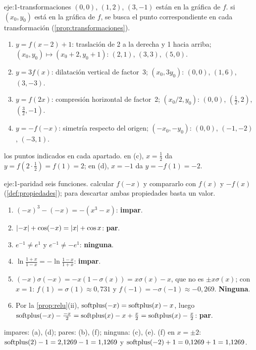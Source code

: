 \begin{solucion}{eje:1-transformaciones}
\datos $(0,0)$, $(1,2)$, $(3,-1)$ están en la gráfica de $f$.
\planteamiento si $(x_0,y_0)$ está en la gráfica de $f$, se busca el punto correspondiente en cada transformación (\cref{prop:transformaciones}).
\pasos
\begin{enumerate}[label=(\alph*)]
  \item $y=f(x-2)+1$: traslación de 2 a la derecha y 1 hacia arriba; $(x_0,y_0)\mapsto(x_0+2,y_0+1)$: $(2,1)$, $(3,3)$, $(5,0)$.
  \item $y=3f(x)$: dilatación vertical de factor~3; $(x_0,3y_0)$: $(0,0)$, $(1,6)$, $(3,-3)$.
  \item $y=f(2x)$: compresión horizontal de factor~2; $(x_0/2,y_0)$: $(0,0)$, $(\tfrac12,2)$, $(\tfrac32,-1)$.
  \item $y=-f(-x)$: simetría respecto del origen; $(-x_0,-y_0)$: $(0,0)$, $(-1,-2)$, $(-3,1)$.
\end{enumerate}
\resultado los puntos indicados en cada apartado.
\comprobacion en (c), $x=\tfrac12$ da $y=f(2\cdot\tfrac12)=f(1)=2$; en (d), $x=-1$ da $y=-f(1)=-2$.
\end{solucion}

\begin{solucion}{eje:1-paridad}
\datos seis funciones.
\planteamiento calcular $f(-x)$ y compararlo con $f(x)$ y $-f(x)$ (\cref{def:propiedades}); para descartar ambas propiedades basta un valor.
\pasos
\begin{enumerate}[label=(\alph*)]
  \item $(-x)^{3}-(-x)=-(x^{3}-x)$: \textbf{impar}.
  \item $\lvert-x\rvert+\cos(-x)=\lvert x\rvert+\cos x$: \textbf{par}.
  \item $e^{-1}\ne e^{1}$ y $e^{-1}\ne-e^{1}$: \textbf{ninguna}.
  \item $\ln\frac{1+x}{1-x}=-\ln\frac{1-x}{1+x}$: \textbf{impar}.
  \item $(-x)\sigma(-x)=-x(1-\sigma(x))=x\sigma(x)-x$, que no es $\pm x\sigma(x)$; con $x=1$: $f(1)=\sigma(1)\approx0{,}731$ y $f(-1)=-\sigma(-1)\approx-0{,}269$. \textbf{Ninguna}.
  \item Por la \cref{prop:relu}(ii), $\operatorname{softplus}(-x)=\operatorname{softplus}(x)-x$, luego $\operatorname{softplus}(-x)-\frac{-x}{2}=\operatorname{softplus}(x)-x+\frac x2=\operatorname{softplus}(x)-\frac x2$: \textbf{par}.
\end{enumerate}
\resultado impares: (a), (d); pares: (b), (f); ninguna: (c), (e).
\comprobacion (f) en $x=\pm2$: $\operatorname{softplus}(2)-1=2{,}1269-1=1{,}1269$ y $\operatorname{softplus}(-2)+1=0{,}1269+1=1{,}1269$.
\end{solucion}

